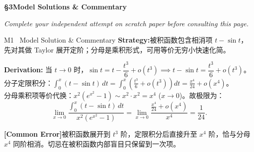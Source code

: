 \documentclass[a4paper,11pt]{article}
\newcommand{\alerttag}[1]{\textcolor{wine}{\sffamily\bfseries [#1]}}
\begin{document}
\clearpage

{\Large\sffamily\bfseries\color{navy} \S 3\quad Model Solutions \& Commentary}

\vspace{1pt}
{\small\color{mist}\itshape\hspace{1pt} Complete your independent attempt on scratch paper before consulting this page.}

\vspace{8pt}

\begin{solution}{M1 \textperiodcentered\ Model Solution \& Commentary}
\textbf{Strategy:}\enspace 被积函数包含相消项 $t - \sin t$，先对其做 Taylor 展开定阶；分母是乘积形式，可用等价无穷小快速化简。

\vspace{1mm}
\textbf{Derivation:}\enspace
当 $t \to 0$ 时，$\sin t = t - \dfrac{t^3}{6} + o(t^3) \implies t - \sin t = \dfrac{t^3}{6} + o(t^3)$。\\
分子定限积分：$\displaystyle\int_0^x (t - \sin t)\,dt = \int_0^x \left(\frac{t^3}{6} + o(t^3)\right)dt = \frac{x^4}{24} + o(x^4)$。\\
分母乘积项等价代换：$x^2 (e^{x^2} - 1) \sim x^2 \cdot x^2 = x^4$ ($x \to 0$)。故极限为：
\[
  \lim_{x\to 0}\frac{\int_0^x (t-\sin t)\,dt}{x^2 (e^{x^2}-1)} = \lim_{x\to 0}\frac{\frac{x^4}{24} + o(x^4)}{x^4} = \frac{1}{24}.
\]

\begin{warnbox}
\alerttag{Common Error}\enspace 被积函数展开到 $t^3$ 阶，定限积分后直接升至 $x^4$ 阶，恰与分母 $x^4$ 同阶相消。切忌在被积函数内部盲目只保留到一次项。
\end{warnbox}
\end{solution}

\vspace{4pt}
\end{document}
